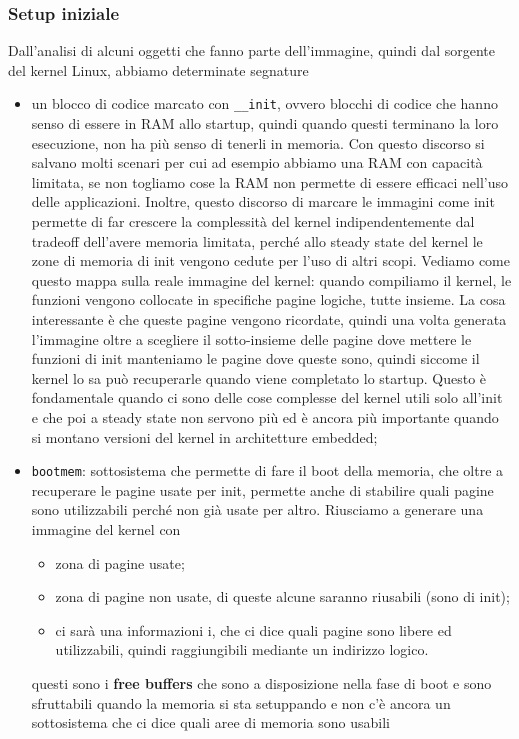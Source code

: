 \documentclass[12pt, oneside]{extbook}
\begin{document}
\subsubsection{Setup iniziale}
Dall'analisi di alcuni oggetti che fanno parte dell'immagine, quindi dal sorgente del kernel Linux, abbiamo determinate segnature
\begin{itemize}
\item un blocco di codice marcato con \texttt{\_\_init}, ovvero blocchi di codice che hanno senso di essere in RAM allo startup, quindi quando questi terminano la loro esecuzione, non ha più senso di tenerli in memoria. Con questo discorso si salvano molti scenari per cui ad esempio abbiamo una RAM con capacità limitata, se non togliamo cose la RAM non permette di essere efficaci nell'uso delle applicazioni. Inoltre, questo discorso di marcare le immagini come init permette di far crescere la complessità del kernel indipendentemente dal tradeoff dell'avere memoria limitata, perché allo steady state del kernel le zone di memoria di init vengono cedute per l'uso di altri scopi. Vediamo come questo mappa sulla reale immagine del kernel: quando compiliamo il kernel, le funzioni vengono collocate in specifiche pagine logiche, tutte insieme. La cosa interessante è che queste pagine vengono ricordate, quindi una volta generata l'immagine oltre a scegliere il sotto-insieme delle pagine dove mettere le funzioni di init manteniamo le pagine dove queste sono, quindi siccome il kernel lo sa può recuperarle quando viene completato lo startup. Questo è fondamentale quando ci sono delle cose complesse del kernel utili solo all'init e che poi a steady state non servono più ed è ancora più importante quando si montano versioni del kernel in architetture embedded;
\item \texttt{bootmem}: sottosistema che permette di fare il boot della memoria, che oltre a recuperare le pagine usate per init, permette anche di stabilire quali pagine sono utilizzabili perché non già usate per altro. Riusciamo a generare una immagine del kernel con
\begin{itemize}
\item zona di pagine usate;
\item zona di pagine non usate, di queste alcune saranno riusabili (sono di init);
\item ci sarà una informazioni i, che ci dice quali pagine sono libere ed utilizzabili, quindi raggiungibili mediante un indirizzo logico.
\end{itemize}
questi sono i \textbf{free buffers} che sono a disposizione nella fase di boot e sono sfruttabili quando la memoria si sta setuppando e non c'è ancora un sottosistema che ci dice quali aree di memoria sono usabili
\end{itemize}
\end{document}
